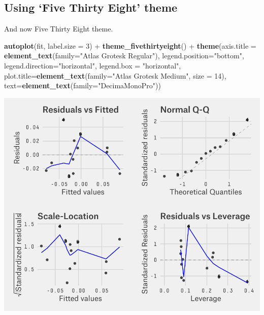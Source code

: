 \documentclass[]{article}
\newenvironment{Shaded}{\begin{snugshade}}{\end{snugshade}}
\newcommand{\KeywordTok}[1]{\textcolor[rgb]{0.13,0.29,0.53}{\textbf{{#1}}}}
\newcommand{\DataTypeTok}[1]{\textcolor[rgb]{0.13,0.29,0.53}{{#1}}}
\newcommand{\DecValTok}[1]{\textcolor[rgb]{0.00,0.00,0.81}{{#1}}}
\newcommand{\StringTok}[1]{\textcolor[rgb]{0.31,0.60,0.02}{{#1}}}
\newcommand{\NormalTok}[1]{{#1}}
\begin{document}
\subsection{\texorpdfstring{Using `Five Thirty Eight'
theme}{Using Five Thirty Eight theme}}\label{using-five-thirty-eight-theme-1}

And now Five Thirty Eight theme.

\begin{Shaded}
\begin{Highlighting}[]
\KeywordTok{autoplot}\NormalTok{(fit, }\DataTypeTok{label.size =} \DecValTok{3}\NormalTok{) +}\StringTok{ }\KeywordTok{theme_fivethirtyeight}\NormalTok{() +}\StringTok{ }
\StringTok{  }\KeywordTok{theme}\NormalTok{(}\DataTypeTok{axis.title =} \KeywordTok{element_text}\NormalTok{(}\DataTypeTok{family=}\StringTok{"Atlas Grotesk Regular"}\NormalTok{),}
    \DataTypeTok{legend.position=}\StringTok{"bottom"}\NormalTok{, }
    \DataTypeTok{legend.direction=}\StringTok{"horizontal"}\NormalTok{,}
    \DataTypeTok{legend.box =} \StringTok{"horizontal"}\NormalTok{,}
    \DataTypeTok{plot.title=}\KeywordTok{element_text}\NormalTok{(}\DataTypeTok{family=}\StringTok{"Atlas Grotesk Medium"}\NormalTok{, }\DataTypeTok{size =} \DecValTok{14}\NormalTok{), }
    \DataTypeTok{text=}\KeywordTok{element_text}\NormalTok{(}\DataTypeTok{family=}\StringTok{"DecimaMonoPro"}\NormalTok{))}
\end{Highlighting}
\end{Shaded}

\begin{center}\includegraphics{11_Linear_Regression_Plot_pdf/lr_23-1} \end{center}
\end{document}
